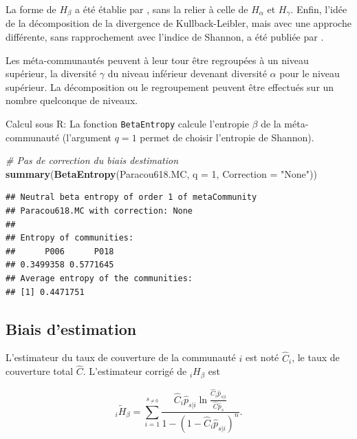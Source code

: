 \documentclass[
  11pt,
  french,
  a4paper,
  extrafontsizes,onecolumn,openright
  ]{memoir}
\newenvironment{Shaded}{\begin{snugshade}}{\end{snugshade}}
\newcommand{\AttributeTok}[1]{\textcolor[rgb]{0.13,0.29,0.53}{#1}}
\newcommand{\CommentTok}[1]{\textcolor[rgb]{0.56,0.35,0.01}{\textit{#1}}}
\newcommand{\DecValTok}[1]{\textcolor[rgb]{0.00,0.00,0.81}{#1}}
\newcommand{\FunctionTok}[1]{\textcolor[rgb]{0.13,0.29,0.53}{\textbf{#1}}}
\newcommand{\NormalTok}[1]{#1}
\newcommand{\StringTok}[1]{\textcolor[rgb]{0.31,0.60,0.02}{#1}}
\begin{document}
La forme de \(H_{\beta}\) a été établie par \textcite{Ricotta2003a}, sans la relier à celle de \(H_{\alpha}\) et \(H_{\gamma}\).
Enfin, l'idée de la décomposition de la divergence de Kullback-Leibler, mais avec une approche différente, sans rapprochement avec l'indice de Shannon, a été publiée par \textcite{Ludovisi2006}.

Les méta-communautés peuvent à leur tour être regroupées à un niveau supérieur, la diversité \(\gamma\) du niveau inférieur devenant diversité \(\alpha\) pour le niveau supérieur.
La décomposition ou le regroupement peuvent être effectués sur un nombre quelconque de niveaux.

Calcul sous R: La fonction \texttt{BetaEntropy} calcule l'entropie \(\beta\) de la méta-communauté (l'argument \(q=1\) permet de choisir l'entropie de Shannon).

\scriptsize

\begin{Shaded}
\begin{Highlighting}[]
\CommentTok{\# Pas de correction du biais d\textquotesingle{}estimation}
\FunctionTok{summary}\NormalTok{(}\FunctionTok{BetaEntropy}\NormalTok{(Paracou618.MC, }\AttributeTok{q =} \DecValTok{1}\NormalTok{, }\AttributeTok{Correction =} \StringTok{"None"}\NormalTok{))}
\end{Highlighting}
\end{Shaded}

\begin{verbatim}
## Neutral beta entropy of order 1 of metaCommunity 
## Paracou618.MC with correction: None 
## 
## Entropy of communities: 
##      P006      P018 
## 0.3499358 0.5771645 
## Average entropy of the communities: 
## [1] 0.4471751
\end{verbatim}

\normalsize

\subsection{Biais d'estimation}\label{sec-BiaisShannonBeta}

L'estimateur du taux de couverture de la communauté \(i\) est noté \(\hat{C}_i\), le taux de couverture total \(\hat{C}\).
L'estimateur corrigé de \(_iH_{\beta}\) est

\begin{equation}
  \label{eq:EstHbetai}
  _{i}\tilde{H}_{\beta} = \sum^{s_{\ne 0}}_{i=1}{\frac{{\hat{C}}_i{\hat{p}}_{s|i} \ln\frac{{\hat{C}}_i{\hat{p}}_{s|i}}{\hat{C}{\hat{p}}_s}}{1-{\left(1-{\hat{C}}_i{\hat{p}}_{s|i}\right)}^n}}.
\end{equation}
\end{document}
